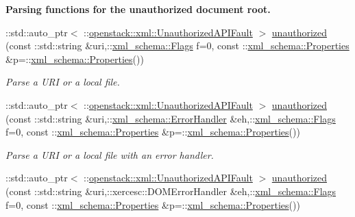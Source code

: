 \begin{Indent}{\bf Parsing functions for the unauthorized document root.}\par
\begin{DoxyCompactItemize}
\item 
::std::auto\_\-ptr$<$ ::\hyperlink{classopenstack_1_1xml_1_1UnauthorizedAPIFault}{openstack::xml::UnauthorizedAPIFault} $>$ \hyperlink{namespaceopenstack_1_1xml_a59ac5b8b7417282f315521a299ac1b76}{unauthorized} (const ::std::string \&uri,::\hyperlink{namespacexml__schema_affb4c227cbd9aa7453dd1dc5a1401943}{xml\_\-schema::Flags} f=0, const ::\hyperlink{namespacexml__schema_ad27ce19a7ee1d3b1064092648898f64c}{xml\_\-schema::Properties} \&p=::\hyperlink{namespacexml__schema_ad27ce19a7ee1d3b1064092648898f64c}{xml\_\-schema::Properties}())
\begin{DoxyCompactList}\small\item\em Parse a URI or a local file. \item\end{DoxyCompactList}\item 
::std::auto\_\-ptr$<$ ::\hyperlink{classopenstack_1_1xml_1_1UnauthorizedAPIFault}{openstack::xml::UnauthorizedAPIFault} $>$ \hyperlink{namespaceopenstack_1_1xml_ad6894eb090ef240eb973520e62da87e1}{unauthorized} (const ::std::string \&uri,::\hyperlink{namespacexml__schema_ab1c9361bfd3b404eaabf0c31eded79dc}{xml\_\-schema::ErrorHandler} \&eh,::\hyperlink{namespacexml__schema_affb4c227cbd9aa7453dd1dc5a1401943}{xml\_\-schema::Flags} f=0, const ::\hyperlink{namespacexml__schema_ad27ce19a7ee1d3b1064092648898f64c}{xml\_\-schema::Properties} \&p=::\hyperlink{namespacexml__schema_ad27ce19a7ee1d3b1064092648898f64c}{xml\_\-schema::Properties}())
\begin{DoxyCompactList}\small\item\em Parse a URI or a local file with an error handler. \item\end{DoxyCompactList}\item 
::std::auto\_\-ptr$<$ ::\hyperlink{classopenstack_1_1xml_1_1UnauthorizedAPIFault}{openstack::xml::UnauthorizedAPIFault} $>$ \hyperlink{namespaceopenstack_1_1xml_a24d08b62a6747aa07e564026df8a0635}{unauthorized} (const ::std::string \&uri,::xercesc::DOMErrorHandler \&eh,::\hyperlink{namespacexml__schema_affb4c227cbd9aa7453dd1dc5a1401943}{xml\_\-schema::Flags} f=0, const ::\hyperlink{namespacexml__schema_ad27ce19a7ee1d3b1064092648898f64c}{xml\_\-schema::Properties} \&p=::\hyperlink{namespacexml__schema_ad27ce19a7ee1d3b1064092648898f64c}{xml\_\-schema::Properties}())

\end{DoxyCompactItemize}
\end{Indent}
